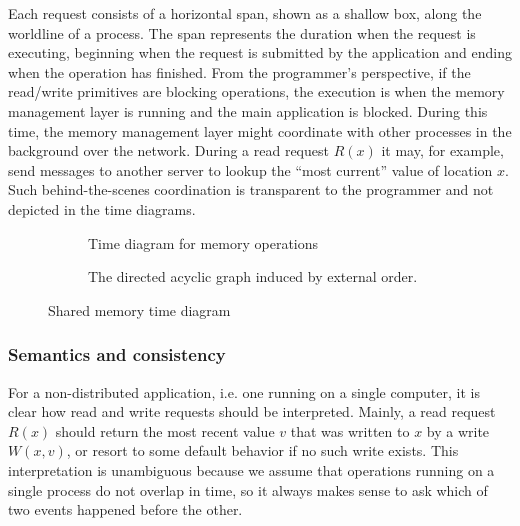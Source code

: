 \documentclass[]             %
{NASA}                       %
\theoremstyle{definition}
\begin{document}
Each request consists of a horizontal span, shown as a shallow box,
along the worldline of a process. The span represents the duration
when the request is executing, beginning when the request is submitted
by the application and ending when the operation has finished. From
the programmer's perspective, if the read/write primitives are
blocking operations, the execution is when the memory management layer
is running and the main application is blocked. During this time, the
memory management layer might coordinate with other processes in the
background over the network. During a read request $R(x)$ it may, for
example, send messages to another server to lookup the ``most
current'' value of location $x$. Such behind-the-scenes coordination
is transparent to the programmer and not depicted in the time
diagrams.

\begin{figure}[p]
  \setlength\belowcaptionskip{5ex}

  \begin{subfigure}{1\textwidth}
    \centering
    
    \caption{Time diagram for memory operations}
    \label{fig:external1}
  \end{subfigure}

  \begin{subfigure}{1\textwidth}
    \centering 
    \caption{The directed acyclic graph induced by external order.}
    \label{fig:externalDAG}
  \end{subfigure}

  \caption{Shared memory time diagram}
  \label{fig:external}
\end{figure}

\afterpage{\clearpage}

\subsubsection{Semantics and consistency}

For a non-distributed application, i.e. one running on a single
computer, it is clear how read and write requests should be
interpreted. Mainly, a read request $R(x)$ should return the most
recent value $v$ that was written to $x$ by a write $W(x, v)$, or
resort to some default behavior if no such write exists. This
interpretation is unambiguous because we assume that operations
running on a single process do not overlap in time, so it always makes
sense to ask which of two events happened before the other.
\end{document}

